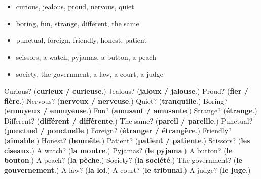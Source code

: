 \begin{itemize}
\raggedright
  \item curious, jealous, proud, nervous, quiet
  \item boring, fun, strange, different, the same
  \item punctual, foreign, friendly, honest, patient
  \item scissors, a watch, pyjamas, a button, a peach
  \item society, the government, a law, a court, a judge
\end{itemize}

\begin{tcolorbox}[breakable,colback=teal!4,colframe=teal!35!black,title={Before you move on}]
Curious? (\textbf{curieux / curieuse}.) Jealous? (\textbf{jaloux / jalouse}.) Proud? (\textbf{fier / fière}.) Nervous? (\textbf{nerveux / nerveuse}.) Quiet? (\textbf{tranquille}.) Boring? (\textbf{ennuyeux / ennuyeuse}.) Fun? (\textbf{amusant / amusante}.) Strange? (\textbf{étrange}.) Different? (\textbf{différent / différente}.) The same? (\textbf{pareil / pareille}.) Punctual? (\textbf{ponctuel / ponctuelle}.) Foreign? (\textbf{étranger / étrangère}.) Friendly? (\textbf{aimable}.) Honest? (\textbf{honnête}.) Patient? (\textbf{patient / patiente}.) Scissors? (\textbf{les ciseaux}.) A watch? (\textbf{la montre}.) Pyjamas? (\textbf{le pyjama}.) A button? (\textbf{le bouton}.) A peach? (\textbf{la pêche}.) Society? (\textbf{la société}.) The government? (\textbf{le gouvernement}.) A law? (\textbf{la loi}.) A court? (\textbf{le tribunal}.) A judge? (\textbf{le juge}.)
\end{tcolorbox}
